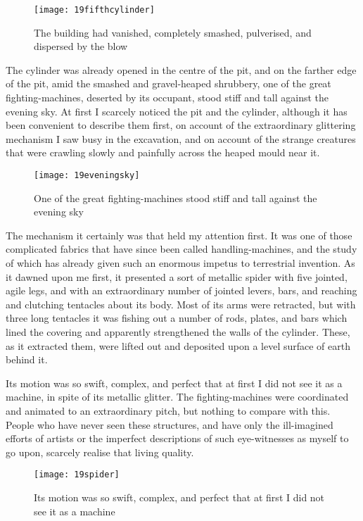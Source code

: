 \begin{figure}[tbp]
\centering
\texttt{[image: 19fifthcylinder]}
\caption[The building was completely smashed by the blow]{The building had vanished, completely smashed, pulverised, and dispersed by the blow}
\end{figure}

The cylinder was already opened in the centre of the pit, and on the farther edge of the pit, amid the smashed and gravel-heaped shrubbery, one of the great fighting-machines, deserted by its occupant, stood stiff and tall against the evening sky. At first I scarcely noticed the pit and the cylinder, although it has been convenient to describe them first, on account of the extraordinary glittering mechanism I saw busy in the excavation, and on account of the strange creatures that were crawling slowly and painfully across the heaped mould near it.


\begin{figure}[tbp]
\centering
\texttt{[image: 19eveningsky]}
\caption[Tall against the evening sky]{One of the great fighting-machines stood stiff and tall against the evening sky}
\end{figure}

The mechanism it certainly was that held my attention first. It was one of those complicated fabrics that have since been called handling-machines, and the study of which has already given such an enormous impetus to terrestrial invention. As it dawned upon me first, it presented a sort of metallic spider with five jointed, agile legs, and with an extraordinary number of jointed levers, bars, and reaching and clutching tentacles about its body. Most of its arms were retracted, but with three long tentacles it was fishing out a number of rods, plates, and bars which lined the covering and apparently strengthened the walls of the cylinder. These, as it extracted them, were lifted out and deposited upon a level surface of earth behind it.

Its motion was so swift, complex, and perfect that at first I did not see it as a machine, in spite of its metallic glitter. The fighting-machines were coordinated and animated to an extraordinary pitch, but nothing to compare with this. People who have never seen these structures, and have only the ill-imagined efforts of artists or the imperfect descriptions of such eye-witnesses as myself to go upon, scarcely realise that living quality.

\begin{figure}[tbp]
\centering
\texttt{[image: 19spider]}
\caption[At first I did not see it as a machine]{Its motion was so swift, complex, and perfect that at first I did not see it as a machine}
\end{figure}

